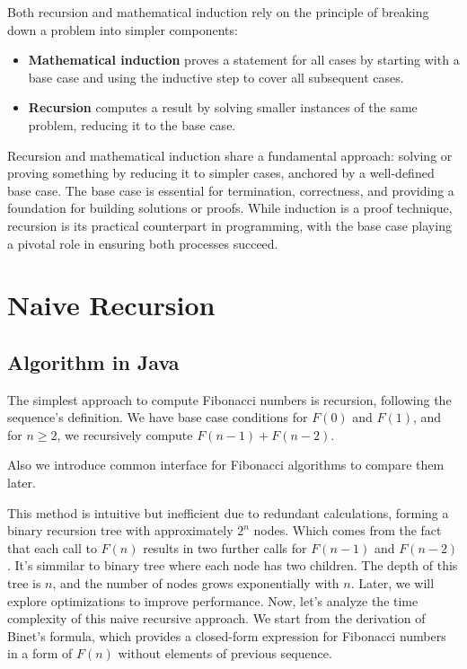 \documentclass{article}
\begin{document}
Both recursion and mathematical induction rely on the principle of breaking down a problem into simpler components:
\begin{itemize}
	\item \textbf{Mathematical induction} proves a statement for all cases by starting with a base case and using the inductive step to cover all subsequent cases.
	\item \textbf{Recursion} computes a result by solving smaller instances of the same problem, reducing it to the base case.
\end{itemize}

Recursion and mathematical induction share a fundamental approach: solving or proving something by reducing it to simpler cases, anchored by a well-defined base case. The base case is essential for termination, correctness, and providing a foundation for building solutions or proofs. While induction is a proof technique, recursion is its practical counterpart in programming, with the base case playing a pivotal role in ensuring both processes succeed.

\section{Naive Recursion}
\subsection{Algorithm in Java}
The simplest approach to compute Fibonacci numbers is recursion, following the sequence's definition. We have base case conditions for \( F(0) \) and \( F(1) \), and for \( n \geq 2 \), we recursively compute \( F(n-1) + F(n-2) \).



Also we introduce common interface for Fibonacci algorithms to compare them later.


This method is intuitive but inefficient due to redundant calculations, forming a binary recursion tree with approximately $2^n$ nodes. Which comes from the fact that each call to \( F(n) \) results in two further calls for \( F(n-1) \) and \( F(n-2) \).
It's simmilar to binary tree where each node has two children. The depth of this tree is \( n \), and the number of nodes grows exponentially with \( n \).
Later, we will explore optimizations to improve performance. Now, let's analyze the time complexity of this naive recursive approach.
We start from the derivation of Binet's formula, which provides a closed-form expression for Fibonacci numbers in a form of $F(n)$ without elements of previous sequence.
\end{document}
